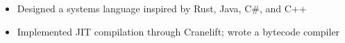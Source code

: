 \begin{itemize}
  \item Designed a systems language inspired by Rust, Java, C\#, and C++
  \item Implemented JIT compilation through Cranelift; wrote a bytecode compiler
\end{itemize}
\vspace{4pt}
